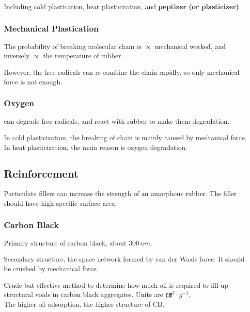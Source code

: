 \documentclass{NoteThesis/note-thesis}
\begin{document}
Including cold plastication, heat plasticization, and \textbf{peptizer (or plasticizer)}.

\subsubsection*{Mechanical Plastication}

The probability of breaking molecular chain is $\propto $ mechanical worked, and inversely $\propto $ the temperature of rubber.

However, the free radicals can re-combine the chain rapidly, so only mechanical force is not enough.

\subsubsection*{Oxygen}

 can degrade free radicals, and react with rubber to make them degradation.

\begin{mynote_env}[frametitle={Cold and Heat Plasticization}]
    In cold plasticization, the breaking of chain is mainly caused by mechanical force.\\
    In heat plasticization, the main reason is oxygen degradation.
\end{mynote_env}

\subsection{Reinforcement}

Particulate fillers can increase the strength of an amorphous rubber. The filler should have high specific surface area.

\subsubsection*{Carbon Black}

Primary structure of carbon black, about $300\, nm$.

Secondary structure, the space network formed by van der Waals force. It should be crushed by mechanical force.

\begin{mynote_env}[frametitle={Oil adsorption}]
    Crude but effective method to determine how much oil is required to fill up structural voids in carbon black aggregates. Units are $㎝ ^3·g^{-1}$.\\
    The higher oil adsorption, the higher structure of CB.
\end{mynote_env}
\end{document}
